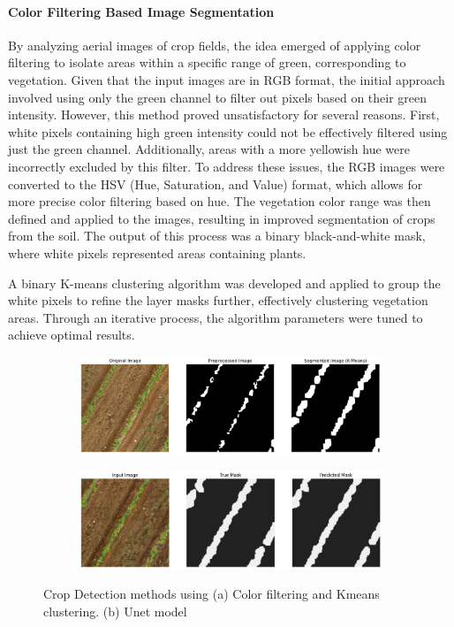 \documentclass[conference]{IEEEtran}
\begin{document}
\paragraph{Color Filtering Based Image Segmentation}
By analyzing aerial images of crop fields, the idea emerged of applying color filtering to isolate areas within a specific range of green, corresponding to vegetation. Given that the input images are in RGB format, the initial approach involved using only the green channel to filter out pixels based on their green intensity. However, this method proved unsatisfactory for several reasons. First, white pixels containing high green intensity could not be effectively filtered using just the green channel. Additionally, areas with a more yellowish hue were incorrectly excluded by this filter. To address these issues, the RGB images were converted to the HSV (Hue, Saturation, and Value) format, which allows for more precise color filtering based on hue. The vegetation color range was then defined and applied to the images, resulting in improved segmentation of crops from the soil. The output of this process was a binary black-and-white mask, where white pixels represented areas containing plants.

A binary K-means clustering algorithm was developed and applied to group the white pixels to refine the layer masks further, effectively clustering vegetation areas. Through an iterative process, the algorithm parameters were tuned to achieve optimal results.

\begin{figure}[htbp]
    \centering
    \begin{subfigure}[b]{0.45\textwidth}
        \centering
        \includegraphics[width=\linewidth]{Kmeans.png}
        \caption{}
        \label{fig2:kmeans}
    \end{subfigure}\hfill
    \begin{subfigure}[b]{0.45\textwidth}
        \centering
        \includegraphics[width=\linewidth]{Dryoutputgrass.png}
        \caption{}
        \label{fig2:filtering}
    \end{subfigure}
    \caption{Crop Detection methods using (a) Color filtering and Kmeans clustering. (b) Unet model}
    \label{fig2:combined}
\end{figure}
\end{document}
